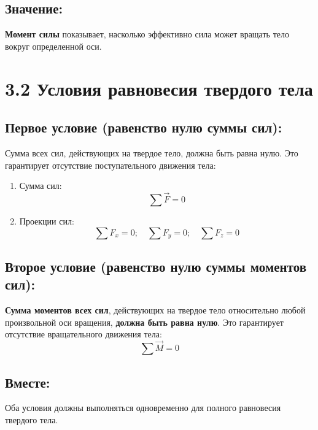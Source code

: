 \documentclass[a4paper,12pt]{article}
\begin{document}
\vspace{-9pt}
\subsection*{Значение:}
\vspace{-3pt}

\textbf{Момент силы} показывает, насколько эффективно сила может вращать тело вокруг определенной оси.




\section*{3.2 Условия равновесия твердого тела}
\vspace{-9pt}
\subsection*{Первое условие (равенство нулю суммы сил):}
\vspace{-3pt}
Сумма всех сил, действующих на твердое тело, должна быть равна нулю. Это гарантирует отсутствие поступательного движения тела:
\begin{enumerate}[itemsep=0pt, topsep=0pt, parsep=2pt]
    \item Сумма сил:
    \vspace{-0.05em}
    $$ \sum{\vec{F}} = 0 $$
    \item Проекции сил:
    \vspace{-0.05em}
    $$ \sum F_x = 0; \quad \sum F_y = 0; \quad \sum F_z = 0 $$
\end{enumerate}

\vspace{-9pt}
\subsection*{Второе условие (равенство нулю суммы моментов сил):}
\vspace{-3pt}
\textbf{Сумма моментов всех сил}, действующих на твердое тело относительно любой произвольной оси вращения, \textbf{должна быть равна нулю}. Это гарантирует отсутствие вращательного движения тела:
$$\sum{\vec{M}} = 0$$

\vspace{-9pt}
\subsection*{Вместе:}
\vspace{-3pt}
Оба условия должны выполняться одновременно для полного равновесия твердого тела.
\end{document}
